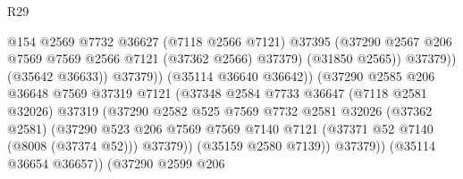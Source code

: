 \begin{lexlean}{R29}
\begin{coremodule}
                                            @154
                                            @2569
                                            @7732
                                            @36627
                                            (@7118 @2566 @7121)
                                            @37395
                                            (@37290
                                              @2567
                                              @206
                                              @7569
                                              @7569
                                              @2566
                                              @7121
                                              (@37362 @2566)
                                              @37379)
                                            (@31850 @2565))
                                          @37379))
                                      (@35642 @36633))
                                    @37379))
                                (@35114 @36640 @36642))
                              (@37290
                                @2585
                                @206
                                @36648
                                @7569
                                @37319
                                @7121
                                (@37348
                                  @2584
                                  @7733
                                  @36647
                                  (@7118 @2581 @32026)
                                  @37319
                                  (@37290
                                    @2582
                                    @525
                                    @7569
                                    @7732
                                    @2581
                                    @32026
                                    (@37362 @2581)
                                    (@37290
                                      @523
                                      @206
                                      @7569
                                      @7569
                                      @7140
                                      @7121
                                      (@37371 @52 @7140 (@8008 (@37374 @52)))
                                      @37379))
                                  (@35159 @2580 @7139))
                                @37379))
                            (@35114 @36654 @36657))
                          (@37290
                            @2599
                            @206

\end{coremodule}
\end{lexlean}
